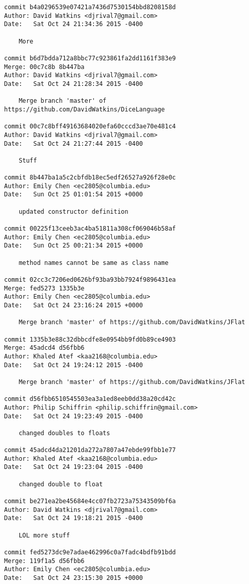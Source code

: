 \begin{verbatim}
commit b4a0296539e07421a7436d7530154bbd8208158d
Author: David Watkins <djrival7@gmail.com>
Date:   Sat Oct 24 21:34:36 2015 -0400

    More

commit b6d7bdda712a8bbc77c923861fa2dd1161f383e9
Merge: 00c7c8b 8b447ba
Author: David Watkins <djrival7@gmail.com>
Date:   Sat Oct 24 21:28:34 2015 -0400

    Merge branch 'master' of https://github.com/DavidWatkins/DiceLanguage

commit 00c7c8bff49163684020efa60cccd3ae70e481c4
Author: David Watkins <djrival7@gmail.com>
Date:   Sat Oct 24 21:27:44 2015 -0400

    Stuff

commit 8b447ba1a5c2cbfdb18ec5edf26527a926f28e0c
Author: Emily Chen <ec2805@columbia.edu>
Date:   Sun Oct 25 01:01:54 2015 +0000

    updated constructor definition

commit 00225f13ceeb3ac4ba51811a308cf069046b58af
Author: Emily Chen <ec2805@columbia.edu>
Date:   Sun Oct 25 00:21:34 2015 +0000

    method names cannot be same as class name

commit 02cc3c7206ed0626bf93ba93bb7924f9896431ea
Merge: fed5273 1335b3e
Author: Emily Chen <ec2805@columbia.edu>
Date:   Sat Oct 24 23:16:24 2015 +0000

    Merge branch 'master' of https://github.com/DavidWatkins/JFlat

commit 1335b3e88c32dbbcdfe8e0954bb9fd0b89ce4903
Merge: 45adcd4 d56fbb6
Author: Khaled Atef <kaa2168@columbia.edu>
Date:   Sat Oct 24 19:24:12 2015 -0400

    Merge branch 'master' of https://github.com/DavidWatkins/JFlat

commit d56fbb6510545503ea3a1ed8eeb0dd38a20cd42c
Author: Philip Schiffrin <philip.schiffrin@gmail.com>
Date:   Sat Oct 24 19:23:49 2015 -0400

    changed doubles to floats

commit 45adcd4da21201da272a7807a47ebde99fbb1e77
Author: Khaled Atef <kaa2168@columbia.edu>
Date:   Sat Oct 24 19:23:04 2015 -0400

    changed double to float

commit be271ea2be45684e4cc07fb2723a75343509bf6a
Author: David Watkins <djrival7@gmail.com>
Date:   Sat Oct 24 19:18:21 2015 -0400

    LOL more stuff

commit fed5273dc9e7adae462996c0a7fadc4bdfb91bdd
Merge: 119f1a5 d56fbb6
Author: Emily Chen <ec2805@columbia.edu>
Date:   Sat Oct 24 23:15:30 2015 +0000


\end{verbatim}
